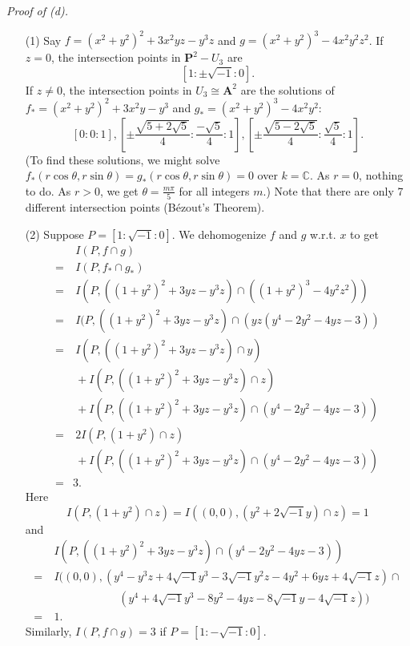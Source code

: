 \documentclass{article}
\begin{document}
\emph{Proof of (d).}
\begin{enumerate}
\item[(1)]
  Say $f = (x^2+y^2)^2 + 3x^2yz - y^3z$ and $g = (x^2+y^2)^3 - 4x^2y^2z^2$.
  If $z = 0$, the intersection points in $\mathbf{P}^{2} - U_3$ are
  \[
    [1:\pm\sqrt{-1}:0].
  \]
  If $z \neq 0$, the intersection points in $U_3 \cong \mathbf{A}^2$ are
  the solutions of $f_{*} = (x^2+y^2)^2 + 3x^2y - y^3$ and $g_{*} = (x^2+y^2)^3 - 4x^2y^2$:
  \[
    [0:0:1],
    \left[ \pm\frac{\sqrt{5+2\sqrt{5}}}{4} : \frac{-\sqrt{5}}{4} : 1 \right],
    \left[ \pm\frac{\sqrt{5-2\sqrt{5}}}{4} : \frac{\sqrt{5}}{4} : 1 \right].
  \]
  (To find these solutions, we might solve
  $f_{*}(r\cos\theta,r\sin\theta) = g_{*}(r\cos\theta,r\sin\theta) = 0$ over $k = \mathbb{C}$.
  As $r = 0$, nothing to do.
  As $r > 0$, we get $\theta = \frac{m\pi}{5}$ for all integers $m$.)
  Note that there are only 7 different intersection points (B\'ezout's Theorem).

\item[(2)]
  Suppose $P = [1:\sqrt{-1}:0]$.
  We dehomogenize $f$ and $g$ w.r.t. $x$ to get
  \begin{align*}
    & \: I(P, f \cap g) \\
    =& \: I(P, f_{*} \cap g_{*}) \\
    =& \: I(P, ((1+y^2)^2 + 3yz - y^3z) \cap ((1+y^2)^3 - 4y^2z^2)) \\
    =& \: I(P, ((1+y^2)^2 + 3yz - y^3z) \cap (yz(y^4 - 2y^2 - 4yz - 3)) \\
    =& \: I(P, ((1+y^2)^2 + 3yz - y^3z) \cap y) \\
      & \: + I(P, ((1+y^2)^2 + 3yz - y^3z) \cap z) \\
      & \: + I(P, ((1+y^2)^2 + 3yz - y^3z) \cap (y^4 - 2y^2 - 4yz - 3)) \\
    =& \: 2I(P, (1+y^2) \cap z) \\
      & \: + I(P, ((1+y^2)^2 + 3yz - y^3z) \cap (y^4 - 2y^2 - 4yz - 3)) \\
    =& 3.
  \end{align*}
  Here
  \[
    I(P, (1+y^2) \cap z) = I((0,0), (y^2 + 2\sqrt{-1}y) \cap z) = 1
  \]
  and
  \begin{align*}
    & \: I(P, ((1+y^2)^2 + 3yz - y^3z) \cap (y^4 - 2y^2 - 4yz - 3)) \\
    =& \: I((0,0),
      (y^4-y^3z + 4\sqrt{-1}y^3-3\sqrt{-1}y^2z - 4y^2 + 6yz + 4\sqrt{-1} z)\cap \\
      & \qquad\qquad\qquad
      (y^4 + 4\sqrt{-1}y^3 - 8y^2-4yz -8\sqrt{-1}y-4\sqrt{-1}z)) \\
    =& \: 1.
  \end{align*}
  Similarly, $I(P, f \cap g) = 3$ if $P = [1:-\sqrt{-1}:0]$.


\end{enumerate}
\end{document}
